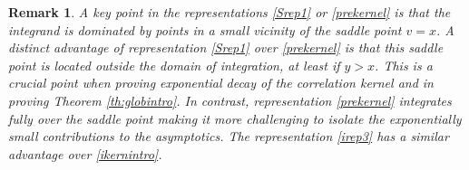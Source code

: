 \documentclass[11pt,reqno]{amsproc}
\newtheorem{remark}[theorem]{Remark}
\numberwithin{equation}{section}
\numberwithin{theorem}{section}
\begin{document}
\begin{remark}
\label{rem:saddle}
A key point in the representations \eqref{Srep1} or \eqref{prekernel} is that the integrand is dominated by points in a small vicinity of the saddle point $v=x$. A distinct advantage of representation \eqref{Srep1} over \eqref{prekernel} is that this saddle point is located outside the domain of integration, at least if $y > x$. This is a crucial point when proving exponential decay of the correlation kernel and in proving Theorem \ref{th:globintro}. In contrast, representation \eqref{prekernel} integrates fully over the saddle point making it more challenging to isolate the exponentially small contributions to the asymptotics. The representation \eqref{irep3} has a similar advantage over \eqref{ikernintro}.
\end{remark}
\end{document}
